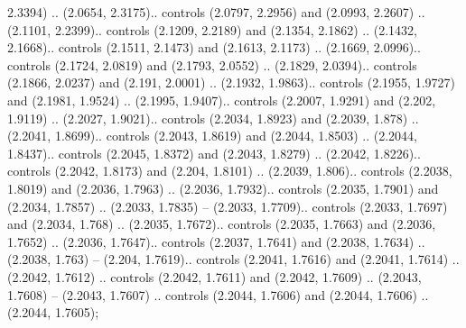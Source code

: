 2.3394) .. (2.0654, 2.3175).. controls (2.0797, 2.2956) and (2.0993, 2.2607) .. (2.1101, 2.2399).. controls (2.1209, 2.2189) and (2.1354, 2.1862) .. (2.1432, 2.1668).. controls (2.1511, 2.1473) and (2.1613, 2.1173) .. (2.1669, 2.0996).. controls (2.1724, 2.0819) and (2.1793, 2.0552) .. (2.1829, 2.0394).. controls (2.1866, 2.0237) and (2.191, 2.0001) .. (2.1932, 1.9863).. controls (2.1955, 1.9727) and (2.1981, 1.9524) .. (2.1995, 1.9407).. controls (2.2007, 1.9291) and (2.202, 1.9119) .. (2.2027, 1.9021).. controls (2.2034, 1.8923) and (2.2039, 1.878) .. (2.2041, 1.8699).. controls (2.2043, 1.8619) and (2.2044, 1.8503) .. (2.2044, 1.8437).. controls (2.2045, 1.8372) and (2.2043, 1.8279) .. (2.2042, 1.8226).. controls (2.2042, 1.8173) and (2.204, 1.8101) .. (2.2039, 1.806).. controls (2.2038, 1.8019) and (2.2036, 1.7963) .. (2.2036, 1.7932).. controls (2.2035, 1.7901) and (2.2034, 1.7857) .. (2.2033, 1.7835) -- (2.2033, 1.7709).. controls (2.2033, 1.7697) and (2.2034, 1.768) .. (2.2035, 1.7672).. controls (2.2035, 1.7663) and (2.2036, 1.7652) .. (2.2036, 1.7647).. controls (2.2037, 1.7641) and (2.2038, 1.7634) .. (2.2038, 1.763) -- (2.204, 1.7619).. controls (2.2041, 1.7616) and (2.2041, 1.7614) .. (2.2042, 1.7612) .. controls (2.2042, 1.7611) and (2.2042, 1.7609) .. (2.2043, 1.7608) -- (2.2043, 1.7607) .. controls (2.2044, 1.7606) and (2.2044, 1.7606) .. (2.2044, 1.7605);



